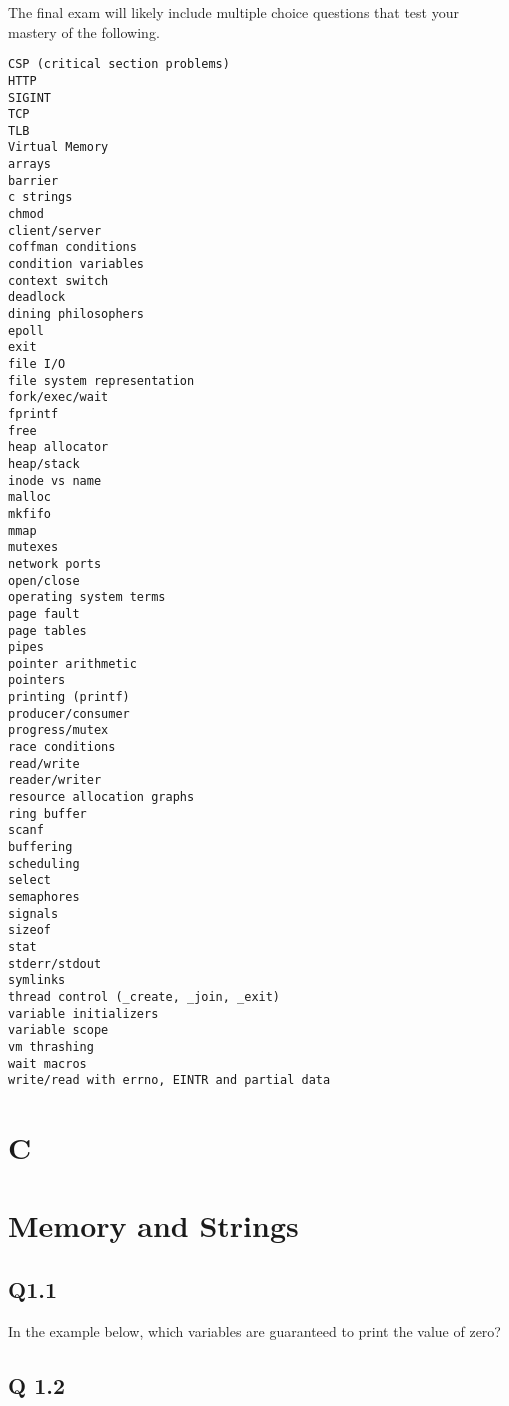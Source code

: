 The final exam will likely include multiple choice questions that test
your mastery of the following.

\begin{verbatim}
CSP (critical section problems)
HTTP
SIGINT
TCP
TLB
Virtual Memory
arrays
barrier
c strings
chmod
client/server
coffman conditions
condition variables
context switch
deadlock
dining philosophers
epoll
exit
file I/O
file system representation
fork/exec/wait
fprintf
free
heap allocator
heap/stack
inode vs name
malloc
mkfifo
mmap
mutexes
network ports
open/close
operating system terms
page fault
page tables
pipes
pointer arithmetic
pointers
printing (printf)
producer/consumer
progress/mutex
race conditions
read/write
reader/writer
resource allocation graphs
ring buffer
scanf 
buffering
scheduling
select
semaphores
signals
sizeof
stat
stderr/stdout
symlinks
thread control (_create, _join, _exit)
variable initializers
variable scope
vm thrashing
wait macros
write/read with errno, EINTR and partial data
\end{verbatim}

\section{C}\label{c}

\section{Memory and Strings}\label{memory-and-strings}

\subsection{Q1.1}\label{q1.1}

In the example below, which variables are guaranteed to print the value
of zero?

\begin{Shaded}
\end{Shaded}

\subsection{Q 1.2}\label{q-1.2}

